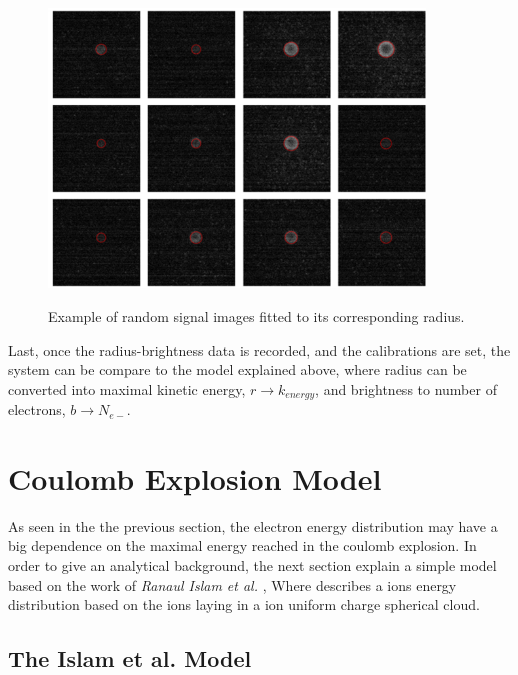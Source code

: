 \begin{figure}[hbtp]
\caption[Example signal finder]{Example of random signal images fitted to its corresponding radius.}
\centering
\includegraphics[width=10cm]{../Images/density_plot_chekc.png}
\label{fig:checkradius}
\end{figure}
Last, once the radius-brightness data is recorded, and the calibrations are set, the system can be compare to the model explained above, where radius can be converted into maximal kinetic energy, $r\rightarrow k_{energy}$, and brightness to number of electrons, $b\rightarrow N_{e-}$. 


\section{Coulomb Explosion Model}

As seen in the  the previous section, the electron energy distribution may have a big dependence on the maximal energy reached in the coulomb explosion.  In order to give an analytical background, the next section  explain a simple  model based on the work of    \textit{Ranaul Islam et al.}  \cite{islam_kinetic_2006}, Where describes a ions energy distribution based on the ions laying in a ion uniform charge spherical cloud.

\subsection{The Islam et al. Model}

